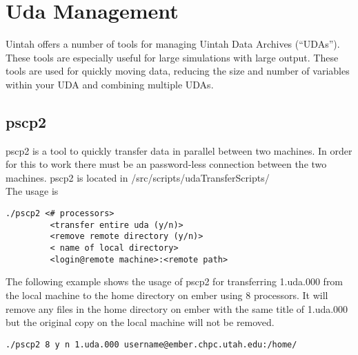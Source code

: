 


\chapter{Uda Management } \label{Chapter:UDA}
Uintah offers a number of tools for managing Uintah Data Archives (``UDAs''). These tools are especially useful for large simulations with large output.  These tools are used for quickly moving data, reducing the size and number of variables within your UDA and combining multiple UDAs. 


\section{pscp2}
pscp2 is a tool to quickly transfer data in parallel between two machines. In order for this to work there must be an password-less connection between the two machines. pscp2 is located in /src/scripts/udaTransferScripts/
\\
The usage is 
\begin{Verbatim}[fontsize=\footnotesize]
 ./pscp2 <# processors> 
         <transfer entire uda (y/n)> 
         <remove remote directory (y/n)> 
         < name of local directory> 
         <login@remote machine>:<remote path>
\end{Verbatim}

The following example shows the usage of pscp2 for transferring 1.uda.000 from the local machine to the home directory on ember using 8 processors. It will remove any files in the home directory on ember with the same title of 1.uda.000 but the original copy on the local machine will not be removed.

\begin{Verbatim}[fontsize=\footnotesize]
 ./pscp2 8 y n 1.uda.000 username@ember.chpc.utah.edu:/home/
\end{Verbatim}

